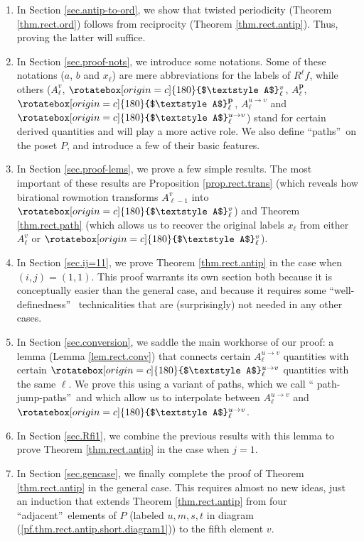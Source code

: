 \documentclass[numbers=enddot,12pt,final,onecolumn,notitlepage]{scrartcl}%
\theoremstyle{definition}
\newcommand{\upslack}{\mathchoice{\rotatebox[origin=c]{180}{$\displaystyle A$}}{\rotatebox[origin=c]{180}{$\textstyle A$}}{\rotatebox[origin=c]{180}{$\scriptstyle A$}}{\rotatebox[origin=c]{180}{$\scriptscriptstyle A$}}}
\newcommand{\downslack}{A}
\begin{document}
\begin{enumerate}
\item In Section \ref{sec.antip-to-ord}, we show that twisted periodicity
(Theorem \ref{thm.rect.ord}) follows from reciprocity (Theorem
\ref{thm.rect.antip}). Thus, proving the latter will suffice.

\item In Section \ref{sec.proof-nots}, we introduce some notations. Some of
these notations ($a$, $b$ and $x_{\ell}$) are mere abbreviations for the
labels of $R^{\ell}f$, while others ($\downslack_{\ell}^{v}$, $\upslack_{\ell
}^{v}$, $\downslack_{\ell}^{\mathbf{p}}$, $\upslack_{\ell}^{\mathbf{p}}$,
$\downslack_{\ell}^{u\rightarrow v}$ and $\upslack_{\ell}^{u\rightarrow v}$)
stand for certain derived quantities and will play a more active role. We also
define \textquotedblleft paths\textquotedblright\ on the poset $P$, and
introduce a few of their basic features.

\item In Section \ref{sec.proof-lems}, we prove a few simple results. The most
important of these results are Proposition \ref{prop.rect.trans} (which
reveals how birational rowmotion transforms $\downslack_{\ell-1}^{v}$ into
$\upslack_{\ell}^{v}$) and Theorem \ref{thm.rect.path} (which allows us to
recover the original labels $x_{\ell}$ from either $\downslack_{\ell}^{v}$ or
$\upslack_{\ell}^{v}$).

\item In Section \ref{sec.ij=11}, we prove Theorem \ref{thm.rect.antip} in the
case when $\left(  i,j\right)  =\left(  1,1\right)  $. This proof warrants its
own section both because it is conceptually easier than the general case, and
because it requires some \textquotedblleft well-definedness\textquotedblright%
\ technicalities that are (surprisingly) not needed in any other cases.

\item In Section \ref{sec.conversion}, we saddle the main workhorse of our
proof: a lemma (Lemma \ref{lem.rect.conv}) that connects certain
$\downslack_{\ell}^{u\rightarrow v}$ quantities with certain $\upslack_{\ell
}^{u\rightarrow v}$ quantities with the same $\ell$. We prove this using a
variant of paths, which we call \textquotedblleft
path-jump-paths\textquotedblright\ and which allow us to interpolate between
$\downslack_{\ell}^{u\rightarrow v}$ and $\upslack_{\ell}^{u\rightarrow v}$.

\item In Section \ref{sec.Rfi1}, we combine the previous results with this
lemma to prove Theorem \ref{thm.rect.antip} in the case when $j=1$.

\item In Section \ref{sec.gencase}, we finally complete the proof of Theorem
\ref{thm.rect.antip} in the general case. This requires almost no new ideas,
just an induction that extends Theorem \ref{thm.rect.antip} from four
\textquotedblleft adjacent\textquotedblright\ elements of $P$ (labeled
$u,m,s,t$ in diagram (\ref{pf.thm.rect.antip.short.diagram1})) to the fifth
element $v$.
\end{enumerate}
\end{document}
